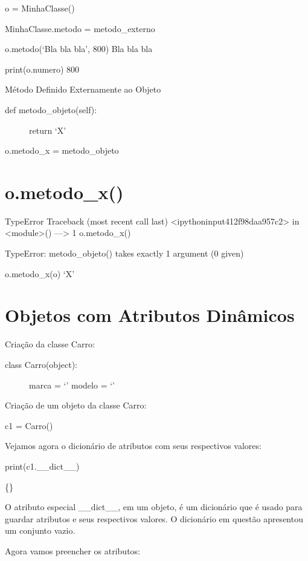 \documentclass[letterpaper,10pt,brazil]{sphinxmanual}
\begin{document}
o = MinhaClasse()

MinhaClasse.metodo = metodo\_externo

o.metodo(‘Bla bla bla’, 800)
Bla bla bla

print(o.numero)
800

Método Definido Externamente ao Objeto
\begin{description}
\item[{def metodo\_objeto(self):}] \leavevmode
return ‘X’

\end{description}

o.metodo\_x = metodo\_objeto


\section{o.metodo\_x()}
\label{\detokenize{content/oo:o-metodo-x}}
TypeError                                 Traceback (most recent call last)
\textless{}ipython\sphinxhyphen{}input\sphinxhyphen{}41\sphinxhyphen{}2f98daa957c2\textgreater{} in \textless{}module\textgreater{}()
—\sphinxhyphen{}\textgreater{} 1 o.metodo\_x()

TypeError: metodo\_objeto() takes exactly 1 argument (0 given)

o.metodo\_x(o)
‘X’


\section{Objetos com Atributos Dinâmicos}
\label{\detokenize{content/oo:objetos-com-atributos-dinamicos}}
Criação da classe Carro:
\begin{description}
\item[{class Carro(object):}] \leavevmode
marca = ‘’
modelo = ‘’

\end{description}

Criação de um objeto da classe Carro:

c1 = Carro()

Vejamos agora o dicionário de atributos com seus respectivos valores:

print(c1.\_\_dict\_\_)

\{\}

O atributo especial \_\_dict\_\_, em um objeto, é um dicionário que é usado para guardar atributos e seus respectivos valores.
O dicionário em questão apresentou um conjunto vazio.

Agora vamos preencher os atributos:
\end{document}
